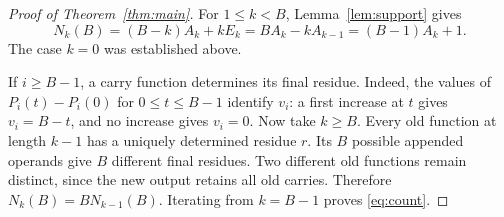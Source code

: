 \documentclass[11pt,a4paper]{article}
\theoremstyle{definition}\newtheorem{definition}[theorem]{Definition}
\begin{document}
\begin{proof}[Proof of Theorem~\ref{thm:main}]
For $1\leq k<B$, Lemma~\ref{lem:support} gives
\[
 N_k(B)=(B-k)A_k+kE_k
       =BA_k-kA_{k-1}=(B-1)A_k+1.
\]
The case $k=0$ was established above.

If $i\geq B-1$, a carry function determines its final residue.
Indeed, the values of $P_i(t)-P_i(0)$ for $0\leq t\leq B-1$
identify $v_i$: a first increase at $t$ gives $v_i=B-t$,
and no increase gives $v_i=0$.
Now take $k\geq B$. Every old function at length $k-1$ has a uniquely
determined residue $r$. Its $B$ possible appended operands give $B$
different final residues. Two different old functions remain distinct,
since the new output retains all old carries.
Therefore $N_k(B)=B N_{k-1}(B)$.
Iterating from $k=B-1$ proves \eqref{eq:count}.
\end{proof}
\end{document}
